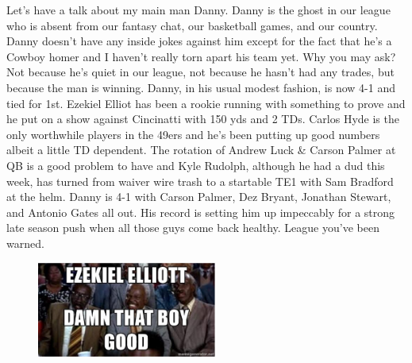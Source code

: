 \documentclass[11pt,letterpaper]{article}
\begin{document}
\newpage
{}
\par\noindent Let's have a talk about my main man Danny. Danny is the ghost in our league who is absent from our fantasy chat, our basketball games, and our country.  Danny doesn't have any inside jokes against him except for the fact that he's a Cowboy homer and I haven't really torn apart his team yet. Why you may ask? Not because he's quiet in our league, not because he hasn't had any trades, but because the man is winning. Danny, in his usual modest fashion, is now 4-1 and tied for 1st. Ezekiel Elliot has been a rookie running with something to prove and he put on a show against Cincinatti with 150 yds and 2 TDs. Carlos Hyde is the only worthwhile players in the 49ers and he's been putting up good numbers albeit a little TD dependent. The rotation of Andrew Luck \& Carson Palmer at QB is a good problem to have and Kyle Rudolph, although he had a dud this week, has turned from waiver wire trash to a startable TE1 with Sam Bradford at the helm. Danny is 4-1 with Carson Palmer, Dez Bryant, Jonathan Stewart, and Antonio Gates all out. His record is setting him up impeccably for a strong late season push when all those guys come back healthy. League you've been warned.
\begin{figure}
\centering
\includegraphics[width=0.525\textwidth]{week5-elliot.png}
\label{fig:week5-elliot}
\end{figure}
\bigskip
\end{document}
